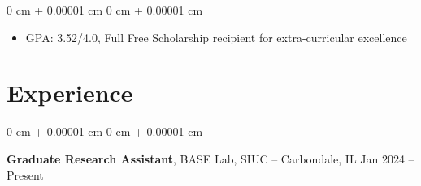 \documentclass[10pt, letterpaper]{article}
\newenvironment{highlights}{
    \begin{itemize}[
        topsep=0.10 cm,
        parsep=0.10 cm,
        partopsep=0pt,
        itemsep=0pt,
        leftmargin=0 cm + 10pt
    ]
}{
    \end{itemize}
} %
\newenvironment{onecolentry}{
    \begin{adjustwidth}{
        0 cm + 0.00001 cm
    }{
        0 cm + 0.00001 cm
    }
}{
    \end{adjustwidth}
} %
\newenvironment{twocolentry}[2][]{
    \onecolentry
    \def\secondColumn{#2}
    \setcolumnwidth{\fill, 4.5 cm}
    \begin{paracol}{2}
}{
    \switchcolumn \raggedleft \secondColumn
    \end{paracol}
    \endonecolentry
} %
\begin{document}
        \vspace{-0.40 cm}
        \begin{onecolentry}
            \begin{highlights}
                \item GPA: 3.52/4.0, Full Free Scholarship recipient for extra-curricular excellence
            \end{highlights}
        \end{onecolentry}



    
    \section{Experience}


        
        \begin{twocolentry}{
            Jan 2024 – Present
        }
            \textbf{Graduate Research Assistant}, BASE Lab, SIUC -- Carbondale, IL\end{twocolentry}
\end{document}
